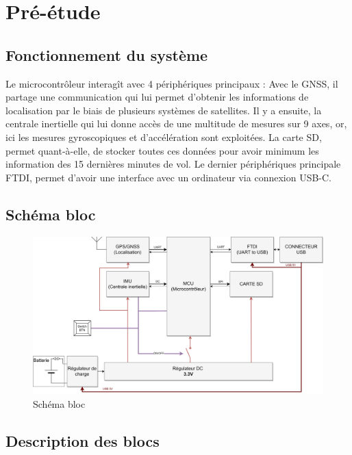 \section{Pré-étude} \label{sec:Pre-Etude}

\subsection{Fonctionnement du système} \label{ssec:Fonctionnement}
Le microcontrôleur interagît avec 4 périphériques principaux : Avec le \gls{GNSS}, il partage une communication qui lui permet d'obtenir les informations de localisation par le biais de plusieurs systèmes de satellites. Il y a ensuite, la centrale inertielle qui lui donne accès de une multitude de mesures sur 9 axes, or, ici les mesures gyroscopiques et d'accélération sont exploitées. La carte SD, permet quant-à-elle, de stocker toutes ces données pour avoir minimum les information des 15 dernières minutes de vol. Le dernier périphériques principale \gls{FTDI}, permet d'avoir une interface avec un ordinateur via connexion USB-C.

\subsection{Schéma bloc} \label{ssec:Schema-bloc}

\begin{figure}[h]
	\centering
	\includegraphics[width=1\textwidth]{../figures/cdc/blocs_grossiers_no_antenna.jpg}
	\caption{Schéma bloc}
	\label{fig:schbloc}
\end{figure}
\subsection{Description des blocs} \label{ssec:Desc-blocs}

